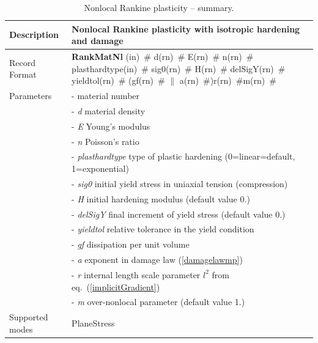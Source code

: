 \documentclass[a4paper]{article}
\newcommand{\descitem}[1]{{\noindent \bf #1}}
\newcommand{\elemparam}[2]{{{#1\tiny (#2)}~\#}}
\newcommand{\param}[1]{{\it #1}}
\begin{document}
\begin{table}[!htb]
\begin{tabular}{|l|p{9cm}|}
\hline
Description & Nonlocal Rankine plasticity with isotropic hardening and damage\\
\hline
Record Format & \descitem{RankMatNl}  \elemparam{}{in}
\elemparam{d}{rn} \elemparam{E}{rn} \elemparam{n}{rn} \elemparam{plasthardtype}{in} \elemparam{sig0}{rn} \elemparam{H}{rn} \elemparam{delSigY}{rn} \elemparam{yieldtol}{rn} (\elemparam{gf}{rn} $\|$ \elemparam{a}{rn})\elemparam{r}{rn}\elemparam{m}{rn} \\
Parameters &- \param{} material number\\
&- \param{d} material density\\
&- \param{E} Young's modulus\\
&- \param{n} Poisson's ratio\\
&- \param{plasthardtype} type of plastic hardening (0=linear=default, 1=exponential)\\
&- \param{sig0} initial yield stress in uniaxial tension (compression)\\
&- \param{H} initial hardening modulus (default value 0.)\\
&- \param{delSigY} final increment of yield stress (default value 0.)\\
&- \param{yieldtol} relative tolerance in the yield condition\\
&- \param{gf} dissipation per unit volume\\
&- \param{a} exponent in damage law (\ref{damagelawmp})\\
&- \param{r} internal length scale parameter $l^2$ from eq.~(\ref{implicitGradient})\\
&- \param{m} over-nonlocal parameter (default value 1.)\\
Supported modes& PlaneStress\\
\hline
\end{tabular}
\caption{Nonlocal Rankine plasticity -- summary.}
\label{rankineMatNl_table}
\end{table}
\end{document}
